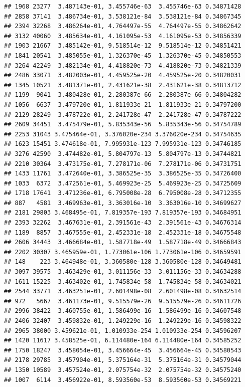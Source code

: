 \documentclass[
]{article}
\begin{document}
\begin{verbatim}
## 1968 23277  3.487143e-01, 3.455746e-63  3.455746e-63 0.34871428
## 2858 37141  3.486734e-01, 3.538121e-84  3.538121e-84 0.34867345
## 2394 32268  3.486264e-01, 4.764497e-55  4.764497e-55 0.34862642
## 3132 40060  3.485634e-01, 4.161095e-53  4.161095e-53 0.34856339
## 1903 21667  3.485142e-01, 9.518514e-12  9.518514e-12 0.34851421
## 1841 20541  3.485055e-01, 1.326370e-45  1.326370e-45 0.34850553
## 3264 42249  3.482134e-01, 4.418820e-73  4.418820e-73 0.34821339
## 2486 33071  3.482003e-01, 4.459525e-20  4.459525e-20 0.34820031
## 1345 10521  3.481371e-01, 2.431621e-38  2.431621e-38 0.34813712
## 1199  9041  3.480428e-01, 2.280387e-66  2.280387e-66 0.34804282
## 1056  6637  3.479720e-01, 1.811933e-21  1.811933e-21 0.34797200
## 2129 28249  3.478722e-01, 2.241728e-47  2.241728e-47 0.34787222
## 2609 34451  3.475479e-01, 5.835343e-56  5.835343e-56 0.34754789
## 2253 31043 3.475464e-01, 3.376020e-234 3.376020e-234 0.34754635
## 1623 15451 3.474618e-01, 7.995931e-123 7.995931e-123 0.34746185
## 3276 42590  3.474482e-01, 5.804797e-13  5.804797e-13 0.34744821
## 2210 30364  3.473175e-01, 7.278171e-06  7.278171e-06 0.34731751
## 1433 11761  3.472640e-01, 3.386525e-35  3.386525e-35 0.34726400
## 1033  6372  3.472561e-01, 5.469923e-25  5.469923e-25 0.34725609
## 1718 17641  3.471236e-01, 6.795008e-28  6.795008e-28 0.34712355
## 887   4581  3.469963e-01, 3.363016e-10  3.363016e-10 0.34699627
## 2181 29803 3.468495e-01, 7.819357e-193 7.819357e-193 0.34684951
## 2393 32262  3.467631e-01, 2.391561e-43  2.391561e-43 0.34676314
## 1189  8857  3.467555e-01, 2.452331e-18  2.452331e-18 0.34675548
## 2606 34443  3.466684e-01, 1.587718e-49  1.587718e-49 0.34666843
## 2202 30307 3.465959e-01, 1.773061e-106 1.773061e-106 0.34659591
## 148    223 3.464948e-01, 3.360580e-128 3.360580e-128 0.34649481
## 3097 39575  3.463429e-01, 3.011156e-33  3.011156e-33 0.34634288
## 1611 15225  3.463402e-01, 1.745834e-58  1.745834e-58 0.34634021
## 2544 33771  3.463251e-01, 2.601498e-08  2.601498e-08 0.34632514
## 972   5667  3.461173e-01, 9.515579e-26  9.515579e-26 0.34611726
## 2996 38422  3.460755e-01, 1.586499e-16  1.586499e-16 0.34607548
## 2406 32407  3.459832e-01, 1.249229e-16  1.249229e-16 0.34598322
## 2965 38000 3.459621e-01, 1.010933e-254 1.010933e-254 0.34596207
## 1420 11617 3.458525e-01, 6.114480e-164 6.114480e-164 0.34585252
## 1750 18247  3.458054e-01, 3.456664e-45  3.456664e-45 0.34580543
## 2178 29785  3.457904e-01, 5.375164e-31  5.375164e-31 0.34579044
## 1350 10589  3.457524e-01, 2.075754e-32  2.075754e-32 0.34575240
## 1007  6114  3.456922e-01, 8.593560e-53  8.593560e-53 0.34569221

\end{verbatim}
\end{document}
